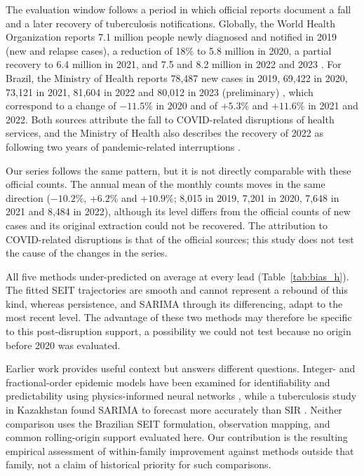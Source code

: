 \documentclass[pdflatex,sn-mathphys-ay,lineno]{sn-jnl}
\begin{document}
The evaluation window follows a period in which official reports document a fall and a later recovery of tuberculosis notifications. Globally, the World Health Organization reports 7.1 million people newly diagnosed and notified in 2019 (new and relapse cases), a reduction of 18\% to 5.8 million in 2020, a partial recovery to 6.4 million in 2021, and 7.5 and 8.2 million in 2022 and 2023 \citep{who2024}. For Brazil, the Ministry of Health reports 78,487 new cases in 2019, 69,422 in 2020, 73,121 in 2021, 81,604 in 2022 and 80,012 in 2023 (preliminary) \citep{moh2024}, which correspond to a change of $-11.5\%$ in 2020 and of $+5.3\%$ and $+11.6\%$ in 2021 and 2022. Both sources attribute the fall to COVID-related disruptions of health services, and the Ministry of Health also describes the recovery of 2022 as following two years of pandemic-related interruptions \citep{who2024,moh2024}.

Our series follows the same pattern, but it is not directly comparable with these official counts. The annual mean of the monthly counts moves in the same direction ($-10.2\%$, $+6.2\%$ and $+10.9\%$; 8,015 in 2019, 7,201 in 2020, 7,648 in 2021 and 8,484 in 2022), although its level differs from the official counts of new cases and its original extraction could not be recovered. The attribution to COVID-related disruptions is that of the official sources; this study does not test the cause of the changes in the series.

All five methods under-predicted on average at every lead (Table~\ref{tab:bias_h}). The fitted SEIT trajectories are smooth and cannot represent a rebound of this kind, whereas persistence, and SARIMA through its differencing, adapt to the most recent level. The advantage of these two methods may therefore be specific to this post-disruption support, a possibility we could not test because no origin before 2020 was evaluated.

Earlier work provides useful context but answers different questions. Integer- and fractional-order epidemic models have been examined for identifiability and predictability using physics-informed neural networks \citep{kharazmi2021}, while a tuberculosis study in Kazakhstan found SARIMA to forecast more accurately than SIR \citep{kalizhanova2024}. Neither comparison uses the Brazilian SEIT formulation, observation mapping, and common rolling-origin support evaluated here. Our contribution is the resulting empirical assessment of within-family improvement against methods outside that family, not a claim of historical priority for such comparisons.
\end{document}

